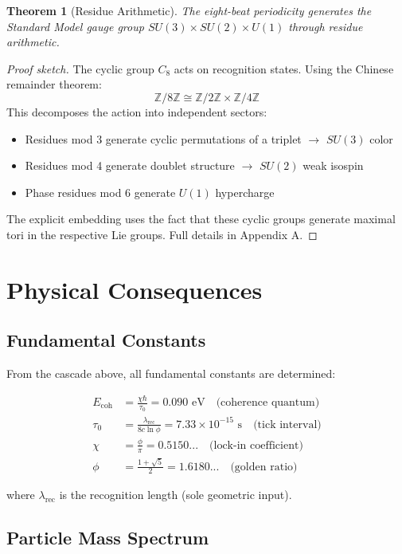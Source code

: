 \documentclass[12pt,a4paper]{article}
\newtheorem{theorem}{Theorem}
\newcommand{\Z}{\mathbb{Z}}
\begin{document}
\begin{theorem}[Residue Arithmetic]\label{thm:gauge}
The eight-beat periodicity generates the Standard Model gauge group $SU(3) \times SU(2) \times U(1)$ through residue arithmetic.
\end{theorem}

\begin{proof}[Proof sketch]
The cyclic group $C_8$ acts on recognition states. Using the Chinese remainder theorem:
\[
\Z/8\Z \cong \Z/2\Z \times \Z/4\Z
\]
This decomposes the action into independent sectors:
\begin{itemize}
\item Residues mod 3 generate cyclic permutations of a triplet $\to$ $SU(3)$ color
\item Residues mod 4 generate doublet structure $\to$ $SU(2)$ weak isospin
\item Phase residues mod 6 generate $U(1)$ hypercharge
\end{itemize}
The explicit embedding uses the fact that these cyclic groups generate maximal tori in the respective Lie groups. Full details in Appendix A.
\end{proof}

\section{Physical Consequences}

\subsection{Fundamental Constants}

From the cascade above, all fundamental constants are determined:

\begin{align}
E_{\text{coh}} &= \frac{\chi \hbar}{\tau_0} = 0.090 \text{ eV} \quad \text{(coherence quantum)}\\
\tau_0 &= \frac{\lambda_{\text{rec}}}{8c \ln \phi} = 7.33 \times 10^{-15} \text{ s} \quad \text{(tick interval)}\\
\chi &= \frac{\phi}{\pi} = 0.5150... \quad \text{(lock-in coefficient)}\\
\phi &= \frac{1+\sqrt{5}}{2} = 1.6180... \quad \text{(golden ratio)}
\end{align}

where $\lambda_{\text{rec}}$ is the recognition length (sole geometric input).

\subsection{Particle Mass Spectrum}
\end{document}

